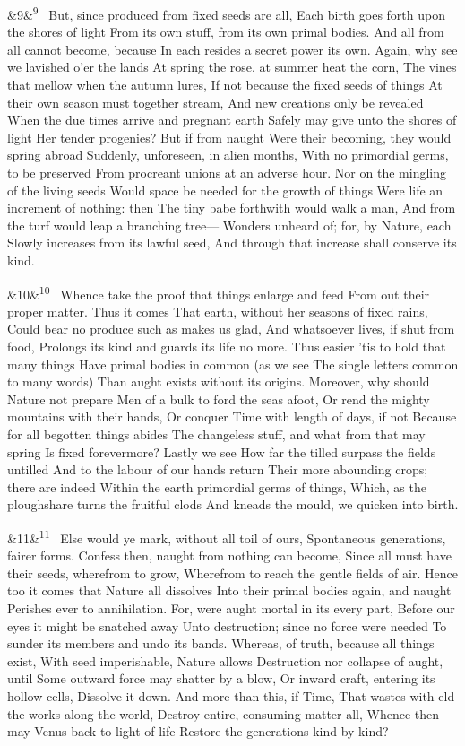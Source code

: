 \documentclass[12pt]{article}
\newcommand{\para}[1][]{\par\noindent\ifx&#1&\else\textsuperscript{\footnotesize #1}~\fi}
\begin{document}
\para[9] But, since produced from fixed seeds are all, Each birth goes forth upon the shores of light From its own stuff, from its own primal bodies. And all from all cannot become, because In each resides a secret power its own. Again, why see we lavished o'er the lands At spring the rose, at summer heat the corn, The vines that mellow when the autumn lures, If not because the fixed seeds of things At their own season must together stream, And new creations only be revealed When the due times arrive and pregnant earth Safely may give unto the shores of light Her tender progenies? But if from naught Were their becoming, they would spring abroad Suddenly, unforeseen, in alien months, With no primordial germs, to be preserved From procreant unions at an adverse hour. Nor on the mingling of the living seeds Would space be needed for the growth of things Were life an increment of nothing: then The tiny babe forthwith would walk a man, And from the turf would leap a branching tree--- Wonders unheard of; for, by Nature, each Slowly increases from its lawful seed, And through that increase shall conserve its kind.

\para[10] Whence take the proof that things enlarge and feed From out their proper matter. Thus it comes That earth, without her seasons of fixed rains, Could bear no produce such as makes us glad, And whatsoever lives, if shut from food, Prolongs its kind and guards its life no more. Thus easier 'tis to hold that many things Have primal bodies in common (as we see The single letters common to many words) Than aught exists without its origins. Moreover, why should Nature not prepare Men of a bulk to ford the seas afoot, Or rend the mighty mountains with their hands, Or conquer Time with length of days, if not Because for all begotten things abides The changeless stuff, and what from that may spring Is fixed forevermore? Lastly we see How far the tilled surpass the fields untilled And to the labour of our hands return Their more abounding crops; there are indeed Within the earth primordial germs of things, Which, as the ploughshare turns the fruitful clods And kneads the mould, we quicken into birth.

\para[11] Else would ye mark, without all toil of ours, Spontaneous generations, fairer forms. Confess then, naught from nothing can become, Since all must have their seeds, wherefrom to grow, Wherefrom to reach the gentle fields of air. Hence too it comes that Nature all dissolves Into their primal bodies again, and naught Perishes ever to annihilation. For, were aught mortal in its every part, Before our eyes it might be snatched away Unto destruction; since no force were needed To sunder its members and undo its bands. Whereas, of truth, because all things exist, With seed imperishable, Nature allows Destruction nor collapse of aught, until Some outward force may shatter by a blow, Or inward craft, entering its hollow cells, Dissolve it down. And more than this, if Time, That wastes with eld the works along the world, Destroy entire, consuming matter all, Whence then may Venus back to light of life Restore the generations kind by kind?
\end{document}

